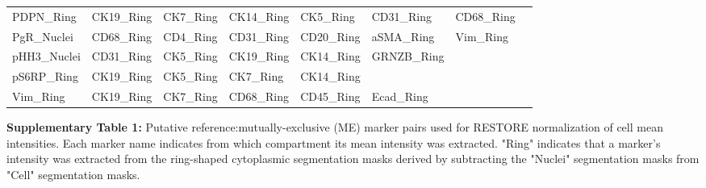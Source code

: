 \documentclass[preprint,review,3p,12pt]{elsarticle}
\begin{document}
\begin{supptable}[p]
{\begin{tabular}{l | l l l l l l l}
PDPN\_Ring    & CK19\_Ring    & CK7\_Ring     & CK14\_Ring  & CK5\_Ring     & CD31\_Ring    & CD68\_Ring    &               \\
PgR\_Nuclei   & CD68\_Ring    & CD4\_Ring     & CD31\_Ring  & CD20\_Ring    & aSMA\_Ring    & Vim\_Ring     &               \\
pHH3\_Nuclei  & CD31\_Ring    & CK5\_Ring     & CK19\_Ring  & CK14\_Ring    & GRNZB\_Ring   &               &               \\
pS6RP\_Ring   & CK19\_Ring    & CK5\_Ring     & CK7\_Ring   & CK14\_Ring    &               &               &               \\
Vim\_Ring     & CK19\_Ring    & CK7\_Ring     & CD68\_Ring  & CD45\_Ring    & Ecad\_Ring    &               &              
\end{tabular}}%
\caption{}
\label{tab:mepairs}
\end{supptable}

\newpage

\noindent
\textbf{Supplementary Table 1:} Putative reference:mutually-exclusive (ME) marker pairs used for RESTORE normalization of cell mean intensities. Each marker name indicates from which compartment its mean intensity was extracted. "Ring" indicates that a marker's intensity was extracted from the ring-shaped cytoplasmic segmentation masks derived by subtracting the "Nuclei" segmentation masks from "Cell" segmentation masks.






\end{document}
